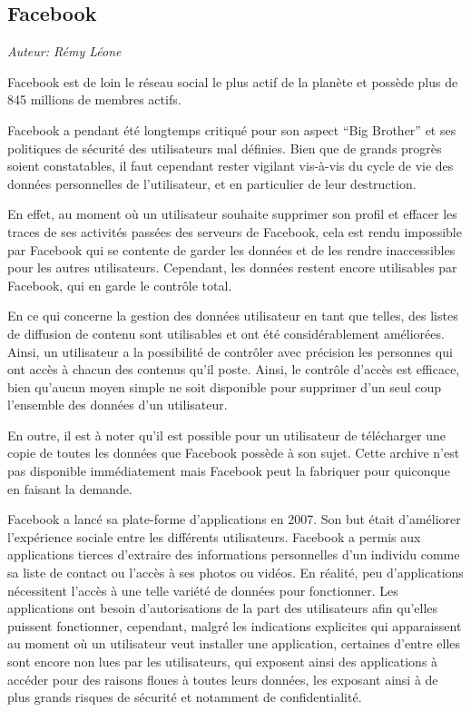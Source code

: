 \subsection{Facebook}

\begin{flushright}\textit{Auteur: Rémy Léone}\end{flushright}

Facebook est de loin le réseau social le plus actif de la planète et possède
plus de 845 millions de membres actifs. \cite{facebook-people}


Facebook a pendant été longtemps critiqué pour son aspect ``Big Brother'' et
ses politiques de sécurité des utilisateurs mal définies. \cite{facebook-eff}
Bien que de grands progrès soient constatables, il faut cependant rester
vigilant vis-à-vis du cycle de vie des données personnelles de l'utilisateur, et
en particulier de leur destruction.

En effet, au moment où un utilisateur souhaite supprimer son profil et effacer
les traces de ses activités passées des serveurs de Facebook, cela est rendu
impossible par Facebook qui se contente de garder les données et de les rendre
inaccessibles pour les autres utilisateurs. Cependant, les données restent
encore utilisables par Facebook, qui en garde le contrôle total.
\cite{facebook-delete-data}

En ce qui concerne la gestion des données utilisateur en tant que telles, des
listes de diffusion de contenu sont utilisables et ont été considérablement
améliorées. Ainsi, un utilisateur a la possibilité de contrôler avec précision
les personnes qui ont accès à chacun des contenus qu'il poste. Ainsi, le
contrôle d'accès est efficace, bien qu'aucun moyen simple ne soit disponible
pour supprimer d'un seul coup l'ensemble des données d'un
utilisateur. \cite{facebook-lists}

En outre, il est à noter qu'il est possible pour un utilisateur de télécharger
une copie de toutes les données que Facebook possède à son sujet. Cette archive
n'est pas disponible immédiatement mais Facebook peut la fabriquer pour
quiconque en faisant la demande.


Facebook a lancé sa plate-forme d’applications en 2007.
\cite{facebook-app-privacy} Son but était d’améliorer l’expérience sociale
entre les différents utilisateurs. Facebook a permis aux applications tierces
d'extraire des informations personnelles d’un individu comme sa liste de
contact ou l'accès à ses photos ou vidéos. En réalité, peu d’applications
nécessitent l’accès à une telle variété de données pour fonctionner. Les
applications ont besoin d'autorisations de la part des utilisateurs afin
qu'elles puissent fonctionner, cependant, malgré les indications explicites qui
apparaissent au moment où un utilisateur veut installer une application,
certaines d'entre elles sont encore non lues par les utilisateurs, qui exposent
ainsi des applications à accéder pour des raisons floues à toutes leurs données,
les exposant ainsi à de plus grands risques de sécurité et notamment de
confidentialité.

